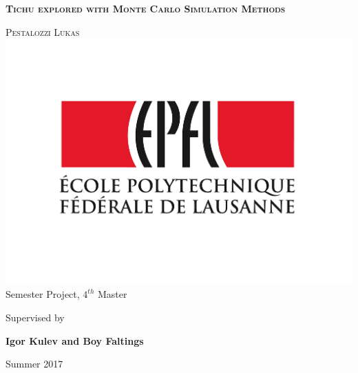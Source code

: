 \begin{titlepage}

\thispagestyle{empty}	%

\begin{center}
\vspace*{1.5cm}
\huge\textsc{\textbf{Tichu explored with Monte Carlo Simulation Methods}}

\vspace*{1.5cm}
\LARGE\textsc{Pestalozzi Lukas} \\[3cm]

\includegraphics[scale=0.6]{images/epfl.pdf} \\[3cm]


\Large
Semester Project, $4^{th}$ Master

\vspace*{1cm}
Supervised by

\vspace*{1cm}
\textbf{Igor Kulev and Boy Faltings}

\vspace*{1cm}
Summer 2017

\end{center}

\vspace{2cm}
\end{titlepage}
